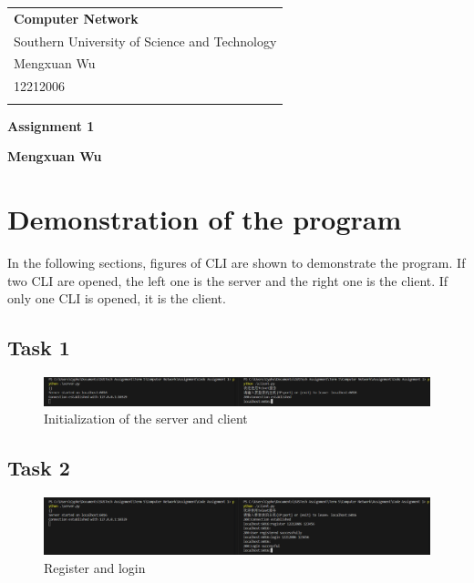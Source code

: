 \documentclass[a4paper,12pt]{article}
\begin{document}
\thispagestyle{empty} %

\begin{tabular}{p{15.5cm}}
{\large \bf Computer Network} \\
Southern University of Science and Technology \\ Mengxuan Wu \\ 12212006 \\
\hline
\\
\end{tabular}

\vspace*{0.3cm} %

\begin{center}
	{\Large \bf Assignment 1}
	\vspace{2mm}

	{\bf Mengxuan Wu}
		
\end{center}  

\vspace{0.4cm}

\section{Demonstration of the program}

In the following sections, figures of CLI are shown to demonstrate the program.
If two CLI are opened, the left one is the server and the right one is the client.
If only one CLI is opened, it is the client.

\subsection{Task 1}

\begin{figure}[H]
    \centering
    \includegraphics[width=\linewidth]{figure/task1.png}
    \caption{Initialization of the server and client}
\end{figure}

\subsection{Task 2}

\begin{figure}[H]
    \centering
    \includegraphics[width=\linewidth]{figure/task2.png}
    \caption{Register and login}
\end{figure}
\end{document}
